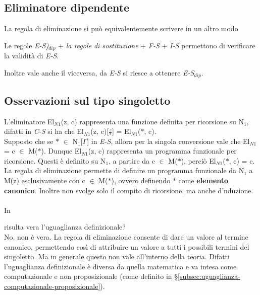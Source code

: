 \subsection{Eliminatore dipendente}
\label{subsec:eliminatore dipendente-singoletto}
La regola di eliminazione si pu\`o equivalentemente scrivere in un altro modo
\begin{prooftree}
\end{prooftree}
Le regole \textit{E-S)$_{dip}$} + \textit{la regole di sostituzione} + \textit{F-S} + \textit{I-S} permettono di verificare la validit\`a di \textit{E-S}.
\begin{prooftree}
\end{prooftree}
\noindent
Inoltre vale anche il viceversa, da \textit{E-S} si riesce a ottenere \textit{E-S$_{dip}$}.
\subsection{Osservazioni sul tipo singoletto}
\label{subsec:osservazioni-singoletto}
L'eliminatore El$_{N1}$(z, c) rappresenta una funzione definita per ricorsione su N$_1$, difatti in \textit{C-S} si ha che El$_{N1}$(z, c)[$\frac{z}{\ast}$] = El$_{N1}$($\ast$, c).\\
Supposto che se $\ast$ $\in$ N$_1$[$\Gamma$] in \textit{E-S}, allora per la singola conversione vale che El$_{N1}$ = c $\in$ M($\ast$).
Dunque El$_{N1}$(z, c) rappresenta un programma funzionale per ricorsione. Questi \`e definito su N$_1$, a partire da c $\in$ M($\ast$), perci\`o El$_{N1}$($\ast$, c) = c.\\
La regola di eliminazione permette di definire un programma funzionale da N$_1$ a M(z) esclusivamente con c $\in$ M($\ast$), ovvero definendo $\ast$ come \textbf{elemento canonico}. Inoltre non svolge solo il compito di ricorsione, ma anche d'nduzione.
\\\\
In \begin{prooftree}
\end{prooftree}
risulta vera l'uguaglianza definizionale?\\
No, non \`e vera. La regola di eliminazione consente di dare un valore al termine canonico, permettendo cos\`i di attribuire un valore a tutti i possibili termini del singoletto. Ma in generale questo non vale all'interno della teoria. Difatti l'uguaglianza definizionale \`e diversa da quella matematica e va intesa come computazionale e non proposizionale (come definito in \S \ref{subsec:uguaglianza-computazionale-proposizionale}).

